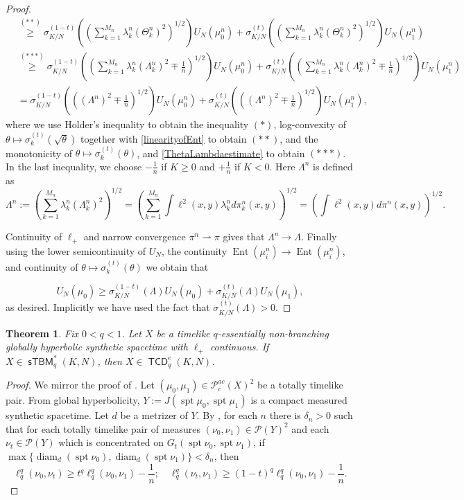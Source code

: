 \documentclass{article}
\newcommand{\narrowto}{\rightharpoonup}
\DeclareMathOperator{\spt}{spt}
\DeclareMathOperator{\diam}{diam}
\newcommand{\Pcal}{\mathcal{P}}
\DeclareMathOperator{\TCD}{\mathsf{TCD}}
\DeclareMathOperator{\sTBM}{\mathsf{sTBM}}
\DeclareMathOperator{\Ent}{Ent}
\newtheorem{theorem}{Theorem}[section]
\theoremstyle{definition}
\begin{document}
{\begin{proof}
\begin{align*}
&\overset{(**)}{\geq} \sigma_{K/N}^{(1-t)}\left(\left(\sum_{k=1}^{M_n} \lambda_k^n \left(\Theta_k^n\right)^2\right)^{1/2}\right)U_N(\mu_0^n)+\sigma_{K/N}^{(t)}\left(\left(\sum_{k=1}^{M_n} \lambda_k^n \left(\Theta_k^n\right)^2\right)^{1/2}\right)U_N(\mu_1^n)\\
&\overset{(***)}{\geq}\sigma_{K/N}^{(1-t)}\left(\left(\sum_{k=1}^{M_n} \lambda_k^n \left(\Lambda_k^n\right)^2\mp \frac{1}{n}\right)^{1/2}\right)U_N(\mu_0^n)+\sigma_{K/N}^{(t)}\left(\left(\sum_{k=1}^{M_n} \lambda_k^n \left(\Lambda_k^n\right)^2\mp \frac{1}{n}\right)^{1/2}\right)U_N(\mu_1^n)\\
&= \sigma_{K/N}^{(1-t)}\left(\left((\Lambda^n)^2\mp \frac{1}{n}\right)^{1/2}\right)U_N(\mu_0^n)+\sigma_{K/N}^{(t)}\left(\left( (\Lambda^n)^2\mp \frac{1}{n}\right)^{1/2}\right)U_N(\mu_1^n),
\end{align*}
where we use Holder's inequality to obtain the inequality $(*)$, log-convexity of $\theta\mapsto \sigma_{k}^{(t)}(\sqrt\theta)$ together with \eqref{linearityofEnt} to obtain $(**)$, and the monotonicity of $\theta\mapsto \sigma_k^{(t)}(\theta)$, and \eqref{ThetaLambdaestimate} to obtain $(*{*}*)$. In the last inequality, we choose $-\frac1n$ if $K\geq 0$ and $+\frac1n$ if $K<0$. Here $\Lambda^n$ is defined as  
\[\Lambda^n:=\left(\sum_{k=1}^{M_n} \lambda_k^n(\Lambda_k^n)^2\right)^{1/2}=\left(\sum_{k=1}^{M_n}\int \ell^2(x,y) \lambda_k^nd\pi^n_k(x,y)\right)^{1/2}=\left(\int \ell^2(x,y) d\pi^n(x,y)\right)^{1/2}.\] 

Continuity of $\ell_+$ and narrow convergence $\pi^n\narrowto \pi$ gives that $\Lambda^n\to \Lambda$. Finally using the lower semicontinuity of $U_N$, the continuity $\Ent(\mu_i^n)\to \Ent(\mu_i^n)$, and continuity of $\theta\mapsto \sigma_{k}^{(t)}(\theta)$ we obtain that

\[U_N(\mu_0)\geq \sigma_{K/N}^{(1-t)}\left( \Lambda\right)U_N(\mu_0)+\sigma_{K/N}^{(t)}\left(\Lambda\right)U_N(\mu_1),
\]
as desired. Implicitly we have used the fact that $\sigma_{K/N}^{(t)}(\Lambda)>0$. 

\end{proof}
\begin{theorem}\label{sTBMtoTCDe} Fix $0<q<1$. Let $X$ be a timelike $q$-essentially non-branching globally hyperbolic synthetic spacetime with $\ell_+$ continuous. If $X\in \sTBM_q^*(K,N)$, then $X\in \TCD_q^e(K,N)$. 
\end{theorem}
\begin{proof}
We mirror the proof of . 
Let $(\mu_0,\mu_1)\in \Pcal_{c}^{ac}(X)^2$ be a totally timelike pair.  From global hyperbolicity, $Y:=J(\spt\mu_0, \spt\mu_1)$ is a compact measured synthetic spacetime. Let $d$ be a metrizer of $Y$. By , for each $n$ there is $\delta_n>0$ such that for each totally timelike pair of measures $(\nu_0, \nu_1)\in\Pcal(Y)^2$ and each $\nu_t\in \Pcal(Y)$ which is concentrated on $G_t(\spt\nu_0, \spt\nu_1)$, if $\max\{\diam_d(\spt\nu_0), \diam_d(\spt\nu_1)\}<\delta_n$, then 
\[\ell_q^q(\nu_0, \nu_t)\geq t^q\ell_q^q(\nu_0, \nu_1)-\frac 1n; \quad \ell_q^q(\nu_t, \nu_1)\geq (1-t)^q\ell_q^q(\nu_0, \nu_1)-\frac 1n.\]


\end{proof}}
\end{document}
